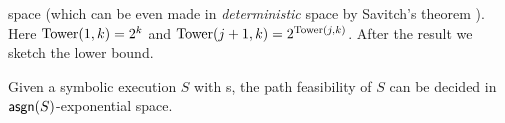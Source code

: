 \noindent space (which can be even made in \emph{deterministic} space by Savitch's theorem \cite{Savitch70}). Here $\mathrm{Tower}(1, k)= 2^k$ and $\mathrm{Tower}(j+1, k) = 2^{\mathrm{Tower}(j, k)}$. 
After the result we sketch the lower bound.
%
\begin{theorem} \label{thm:two-way}
Given a symbolic execution $S$ with \PPT{}s, the path feasibility of $S$ can be decided in $\mathsf{asgn}(S)$-exponential space. 
\end{theorem}



